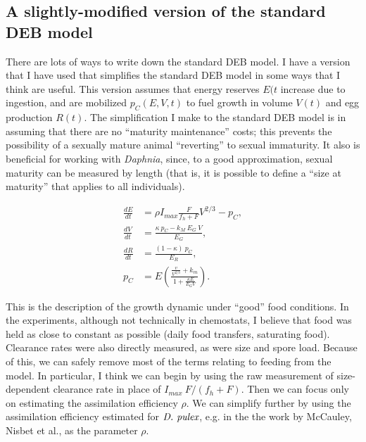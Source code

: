 \documentclass[11pt,reqno,final,pdftex]{amsart}\usepackage[]{graphicx}\usepackage[]{color}
\theoremstyle{plain}
\numberwithin{equation}{part}
\begin{document}
\subsection*{A slightly-modified version of the standard DEB model}
There are lots of ways to write down the standard DEB model.
I have a version that I have used that simplifies the standard DEB model in some ways that I think are useful.
This version assumes that energy reserves $E(t$ increase due to ingestion, and are mobilized $p_C(E,V,t)$ to fuel growth in volume $V(t)$ and egg production $R(t)$.
The simplification I make to the standard DEB model is in assuming that there are no ``maturity maintenance'' costs; this prevents the possibility of a sexually mature animal ``reverting'' to sexual immaturity.
It also is beneficial for working with \emph{Daphnia}, since, to a good approximation, sexual maturity can be measured by length (that is, it is possible to define a ``size at maturity'' that applies to all individuals).

\begin{align}
\frac{dE}{dt} &= \rho I_{max} \frac{F}{f_h+F} V^{2/3} - p_C, \\
\frac{dV}{dt} &= \frac{\kappa~p_C - k_M~E_G~V}{E_G}, \\
\frac{dR}{dt} &= \frac{(1-\kappa)~p_C}{E_R}, \\
p_C &= E \left(\frac{\frac{v}{V^{2/3}} + k_m}{1+\frac{\kappa E}{E_G V}}\right).
\end{align}

This is the description of the growth dynamic under ``good'' food conditions.
In the experiments, although not technically in chemostats, I believe that food was held as close to constant as possible (daily food transfers, saturating food).
Clearance rates were also directly measured, as were size and spore load.
Because of this, we can safely remove most of the terms relating to feeding from the model.
In particular, I think we can begin by using the raw measurement of size-dependent clearance rate in place of $I_{max}~F/(f_h+F)$.
Then we can focus only on estimating the assimilation efficiency $\rho$.
We can simplify further by using the assimilation efficiency estimated for $\emph{D. pulex}$, e.g. in the the work by McCauley, Nisbet et al., as the parameter $\rho$.
\end{document}
